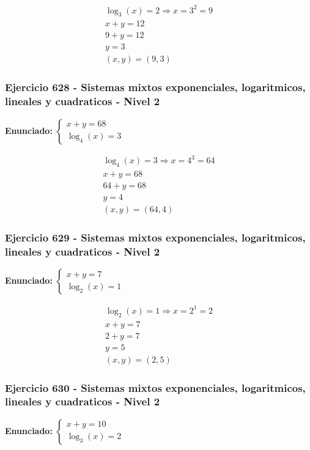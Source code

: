 \documentclass[12pt,a4paper]{article}
\begin{document}
\[
\begin{aligned}
\log_{3}\left(x\right)=2\Rightarrow x=3^{2}=9\\
x+y=12\\
9+y=12\\
y=3\\
\boxed{(x,y)=(9,3)}
\end{aligned}
\]


\subsubsection*{Ejercicio 628 - Sistemas mixtos exponenciales, logaritmicos, lineales y cuadraticos - Nivel 2}
\textbf{Enunciado:} \(\begin{cases} x+y=68\\ \log_{4}\left(x\right)=3\end{cases}\)

\[
\begin{aligned}
\log_{4}\left(x\right)=3\Rightarrow x=4^{3}=64\\
x+y=68\\
64+y=68\\
y=4\\
\boxed{(x,y)=(64,4)}
\end{aligned}
\]


\subsubsection*{Ejercicio 629 - Sistemas mixtos exponenciales, logaritmicos, lineales y cuadraticos - Nivel 2}
\textbf{Enunciado:} \(\begin{cases} x+y=7\\ \log_{2}\left(x\right)=1\end{cases}\)

\[
\begin{aligned}
\log_{2}\left(x\right)=1\Rightarrow x=2^{1}=2\\
x+y=7\\
2+y=7\\
y=5\\
\boxed{(x,y)=(2,5)}
\end{aligned}
\]


\subsubsection*{Ejercicio 630 - Sistemas mixtos exponenciales, logaritmicos, lineales y cuadraticos - Nivel 2}
\textbf{Enunciado:} \(\begin{cases} x+y=10\\ \log_{3}\left(x\right)=2\end{cases}\)
\end{document}
